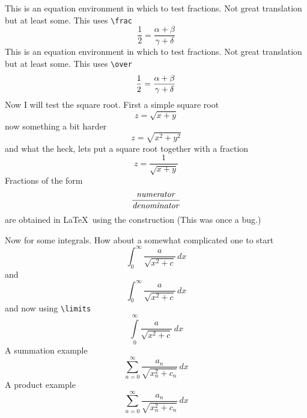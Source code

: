 ﻿\documentclass{article}
\begin{document}
This is an equation environment in which to test fractions.  Not great translation
but at least some.   This uses \verb#\frac#
$$
\frac{1}{2} = \frac{\alpha+\beta}{\gamma+\delta}
$$
This is an equation environment in which to test fractions.  Not great translation
but at least some.  This uses \verb#\over#
$$
{1 \over 2} = {\alpha+\beta \over \gamma+\delta}
$$
Now I will test the square root.  First a simple square root
$$
z = \sqrt{x+y}
$$
now something a bit harder
$$
z = \sqrt{x^2+y^2}
$$
and what the heck, lets put a square root together with a fraction
$$
z = \frac{1}{\sqrt{x+y}}
$$
Fractions of the form
\[ \frac{\mbox{\textit{numerator}}}{\mbox{\textit{denominator}}} \]
are obtained in \LaTeX\ using the construction (This was once a bug.)

Now for some integrals.  How about a somewhat complicated one to start
$$
\int_{0}^{\infty} \frac{a}{\sqrt{x^2+c}}\,dx
$$
and
$$
\int_0^\infty \frac{a}{\sqrt{x^2+c}}\,dx
$$
and now using \verb#\limits#
$$
\int \limits_0^\infty \frac{a}{\sqrt{x^2+c}}\,dx
$$
A summation example
$$
\sum_{n=0}^\infty \frac{a_n}{\sqrt{x_n^2+c_n}}\,dx
$$
A product example
$$
\sum_{n=0}^\infty \frac{a_n}{\sqrt{x_n^2+c_n}}\,dx
$$
\end{document}
